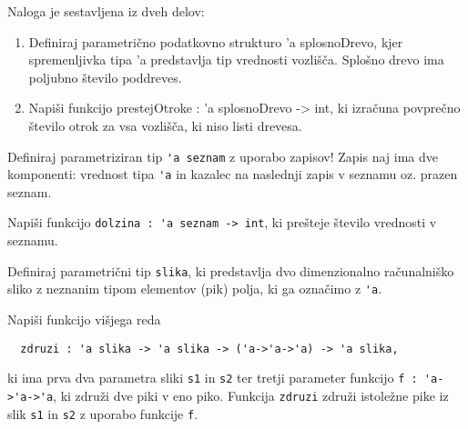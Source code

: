 \begin{ex}
Naloga je sestavljena iz dveh delov:
\begin{enumerate}
    \item Definiraj parametri\v cno podatkovno strukturo 'a splosnoDrevo, kjer spremenljivka tipa 'a predstavlja tip vrednosti vozli\v s\v ca. Splo\v sno drevo ima poljubno \v stevilo poddreves. 
    
    \item Napi\v si funkcijo prestejOtroke : 'a splosnoDrevo -> int, ki izra\v cuna povpre\v cno \v stevilo otrok za vsa vozli\v s\v ca, ki niso listi drevesa.
\end{enumerate}

\end{ex}




\begin{ex}
  Definiraj parametriziran tip \lstinline{'a seznam} z uporabo zapisov!
  Zapis naj ima dve komponenti: vrednost tipa \lstinline{'a} in kazalec na
  naslednji zapis v seznamu oz. prazen seznam.

  Napi\v si funkcijo \lstinline{dolzina : 'a seznam -> int}, ki
  pre\v steje \v stevilo vrednosti v seznamu.
\end{ex} 




\begin{ex}
Definiraj parametri\v cni tip \lstinline{slika}, ki predstavlja dvo dimenzionalno ra\v cunalni\v sko sliko z neznanim tipom elementov (pik) polja, ki ga ozna\v cimo z \lstinline{'a}.

Napi\v si funkcijo vi\v sjega reda

  \begin{lstlisting}
  zdruzi : 'a slika -> 'a slika -> ('a->'a->'a) -> 'a slika,
  \end{lstlisting}

ki ima prva dva parametra sliki \lstinline{s1} in \lstinline{s2} ter tretji parameter funkcijo \lstinline{f : 'a->'a->'a}, ki zdru\v zi dve piki v eno piko. Funkcija \lstinline{zdruzi} zdru\v zi istole\v zne pike iz slik \lstinline{s1} in \lstinline{s2} z uporabo funkcije \lstinline{f}.
\end{ex} 




